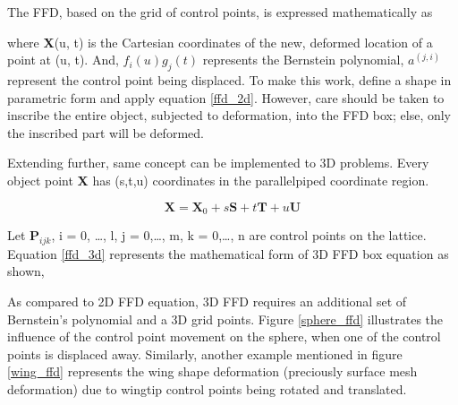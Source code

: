 The FFD, based on the grid of control points, is expressed mathematically as


where \textbf{X}(u, t) is the Cartesian coordinates of the new, deformed location of a point at (u, t). And, $f_i(u)g_j(t)$ represents the Bernstein polynomial, $a^{(j,i)}$ represent the control point being displaced. To make this work, define a shape in parametric form and apply equation \ref{ffd_2d}. However, care should be taken to inscribe the entire object, subjected to deformation, into the FFD box; else, only the inscribed part will be deformed.

Extending further, same concept can be implemented to 3D problems. Every object point \textbf{X} has (s,t,u) coordinates in the parallelpiped coordinate region\cite{soderberg}.

\begin{equation}
\mathbf{X}=\mathbf{X}_{0}+s \mathbf{S}+t \mathbf{T}+u \mathbf{U}
\label{ffd initial equation}
\end{equation}

Let $\textbf{P}_{ijk}$, i = 0, \dots, l, j = 0,\dots, m, k = 0,\dots, n are control points on the lattice. Equation \ref{ffd_3d} represents the mathematical form of 3D FFD box equation as shown,


As compared to 2D FFD equation, 3D FFD requires an additional set of Bernstein's polynomial and a 3D grid points. Figure \ref{sphere_ffd} illustrates the influence of the control point movement on the sphere, when one of the control points is displaced away. Similarly, another example mentioned in figure \ref{wing_ffd} represents the wing shape deformation (preciously surface mesh deformation) due to wingtip control points being rotated and translated.


